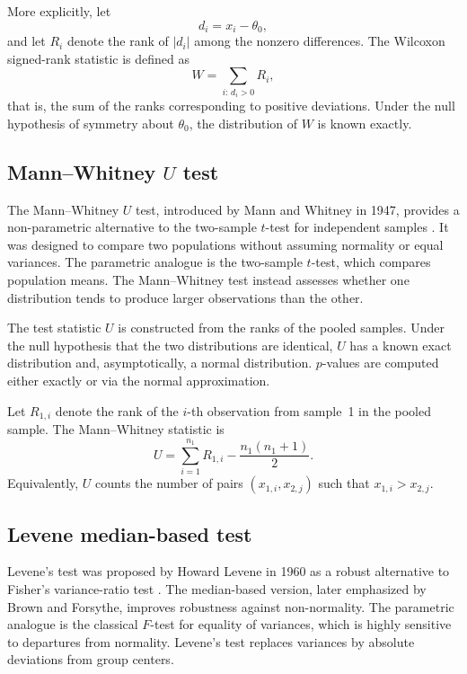 \medskip

More explicitly, let
\[
    d_i = x_i - \theta_0,
\]
and let \(R_i\) denote the rank of \(|d_i|\) among the nonzero differences. The Wilcoxon signed-rank statistic is defined as
\[
    W = \sum_{i:\, d_i > 0} R_i,
\]
that is, the sum of the ranks corresponding to positive deviations. Under the null hypothesis of symmetry about \(\theta_0\), the distribution of \(W\) is known exactly.

\subsection{Mann--Whitney \(U\) test}

The Mann--Whitney \(U\) test, introduced by Mann and Whitney in 1947, provides a non-parametric alternative to the two-sample \(t\)-test for independent samples \cite{mann_whitney_1947_test}. It was designed to compare two populations without assuming normality or equal variances. The parametric analogue is the two-sample \(t\)-test, which compares population means. The Mann--Whitney test instead assesses whether one distribution tends to produce larger observations than the other.

\medskip

The test statistic \(U\) is constructed from the ranks of the pooled samples. Under the null hypothesis that the two distributions are identical, \(U\) has a known exact distribution and, asymptotically, a normal distribution. \(p\)-values are computed either exactly or via the normal approximation.

\medskip

Let \(R_{1,i}\) denote the rank of the \(i\)-th observation from sample~1 in the pooled sample. The Mann--Whitney statistic is
\[
    U
    =
    \sum_{i=1}^{n_1} R_{1,i}
    - \frac{n_1(n_1+1)}{2}.
\]
Equivalently, \(U\) counts the number of pairs \((x_{1,i},x_{2,j})\) such that \(x_{1,i} > x_{2,j}\).

\subsection{Levene median-based test}

Levene's test was proposed by Howard Levene in 1960 as a robust alternative to Fisher’s variance-ratio test \cite{levene_1960_variances}. The median-based version, later emphasized by Brown and Forsythe, improves robustness against non-normality. The parametric analogue is the classical \(F\)-test for equality of variances, which is highly sensitive to departures from normality. Levene’s test replaces variances by absolute deviations from group centers.

